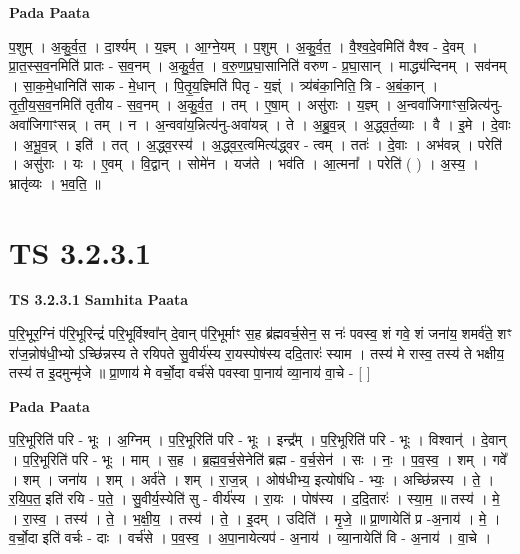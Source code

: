 \documentclass[17pt]{extarticle}
\begin{document}
\textbf{Pada Paata} \newline

प॒शुम् । अ॒कु॒र्व॒त॒ । दा॒र्श्यम् । य॒ज्ञ्म् । आ॒ग्ने॒यम् । प॒शुम् । अ॒कु॒र्व॒त॒ । वै॒श्व॒दे॒वमिति॑ वैश्व - दे॒वम् । प्रा॒त॒स्स॒व॒नमिति॑ प्रातः - स॒व॒नम् । अ॒कु॒र्व॒त॒ । व॒रु॒ण॒प्र॒घा॒सानिति॑ वरुण - प्र॒घा॒सान् । माद्ध्य॑न्दिनम् । सव॑नम् । सा॒क॒मे॒धानिति॑ साक - मे॒धान् । पि॒तृ॒य॒ज्ञ्मिति॑ पितृ - य॒ज्ञ्ं । त्र्य॑बंका॒निति॒ त्रि - अ॒बं॒का॒न् । तृ॒ती॒य॒स॒व॒नमिति॑ तृतीय - स॒व॒नम् । अ॒कु॒र्व॒त॒ । तम् । ए॒षा॒म् । असु॑राः । य॒ज्ञ्म् । अ॒न्ववा॑जिगाꣳस॒न्नित्य॑नु-अवा॑जिगाꣳसन्न् । तम् । न । अ॒न्ववा॑य॒न्नित्य॑नु-अवा॑यन्न् । ते । अ॒ब्रु॒व॒न्न् । अ॒द्ध्व॒र्त॒व्याः । वै । इ॒मे । दे॒वाः । अ॒भू॒व॒न्न् । इति॑ । तत् । अ॒द्ध्व॒रस्य॑ । अ॒द्ध्व॒र॒त्वमित्य॑द्ध्वर - त्वम् । ततः॑ । दे॒वाः । अभ॑वन्न् । परेति॑ । असु॑राः । यः । ए॒वम् । वि॒द्वान् । सोमे॑न । यज॑ते । भव॑ति । आ॒त्मना᳚ । परेति॑ ( ) । अ॒स्य॒ । भ्रातृ॑व्यः । भ॒व॒ति॒ ॥  \newline




\section*{ TS 3.2.3.1 }

\textbf{TS 3.2.3.1 } \newline
\textbf{Samhita Paata} \newline

प॒रि॒भूर॒ग्निं प॑रि॒भूरिन्द्रं॑ परि॒भूर्विश्वा᳚न् दे॒वान् प॑रि॒भूर्माꣳ स॒ह ब्र॑ह्मवर्च॒सेन॒ स नः॑ पवस्व॒ शं गवे॒ शं जना॑य॒ शमर्व॑ते॒ शꣳ रा॑ज॒न्नोष॑धी॒भ्यो ऽच्छि॑न्नस्य ते रयिपते सु॒वीर्य॑स्य रा॒यस्पोष॑स्य ददि॒तारः॑ स्याम । तस्य॑ मे रास्व॒ तस्य॑ ते भक्षीय॒ तस्य॑ त इ॒दमुन्मृ॑जे ॥ प्रा॒णाय॑ मे वर्चो॒दा वर्च॑से पवस्वा पा॒नाय॑ व्या॒नाय॑ वा॒चे - [  ] \newline

\textbf{Pada Paata} \newline

प॒रि॒भूरिति॑ परि - भूः । अ॒ग्निम् । प॒रि॒भूरिति॑ परि - भूः । इन्द्र᳚म् । प॒रि॒भूरिति॑ परि - भूः । विश्वान्॑ । दे॒वान् । प॒रि॒भूरिति॑ परि - भूः । माम् । स॒ह । ब्र॒ह्म॒व॒र्च॒सेनेति॑ ब्रह्म - व॒र्च॒सेन॑ । सः । नः॒ । प॒व॒स्व॒ । शम् । गवे᳚ । शम् । जना॑य । शम् । अर्व॑ते । शम् । रा॒ज॒न्न् । ओष॑धीभ्य॒ इत्योष॑धि - भ्यः॒ । अच्छि॑न्नस्य । ते॒ । र॒यि॒प॒त॒ इति॑ रयि - प॒ते॒ । सु॒वीर्य॒स्येति॑ सु - वीर्य॑स्य । रा॒यः । पोष॑स्य । द॒दि॒तारः॑ । स्या॒म॒ ॥ तस्य॑ । मे॒ । रा॒स्व॒ । तस्य॑ । ते॒ । भ॒क्षी॒य॒ । तस्य॑ । ते॒ । इ॒दम् । उदिति॑ । मृ॒जे॒ ॥ प्रा॒णायेति॑ प्र -अ॒नाय॑ । मे॒ । व॒र्चो॒दा इति॑ वर्चः - दाः । वर्च॑से । प॒व॒स्व॒ । अ॒पा॒नायेत्यप॑ - अ॒नाय॑ । व्या॒नायेति॑ वि - अ॒नाय॑ । वा॒चे ।  \newline
\end{document}
